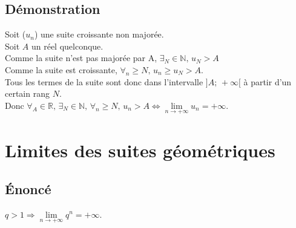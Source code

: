 \documentclass[12px]{article}
\begin{document}
	\subsection{Démonstration}
	Soit ($u_n$) une suite croissante non majorée.\\
	Soit $A$ un réel quelconque.\\
	Comme la suite n'est pas majorée par A, $\exists_N\in\mathbb{N}, \,u_{N}>A$\\
	Comme la suite est croissante, $\forall_n\geq N, \,u_n\geq u_{N}>A$.\\
	Tous les termes de la suite sont donc dans l'intervalle $]A;\,+\infty[$ à partir d'un certain rang $N$.\\
	Donc $\forall_A\in\mathbb{R}, \,\exists_N\in\mathbb{N}, \,\forall_n\geq N, \,u_n >A \Leftrightarrow \lim\limits_{n\rightarrow +\infty}u_n =+\infty$.
	
	\section{Limites des suites géométriques}
	
	\subsection{\'Enoncé}
	$q>1 \Rightarrow \lim\limits_{n\rightarrow +\infty}q^n = +\infty$.
	
\end{document}

